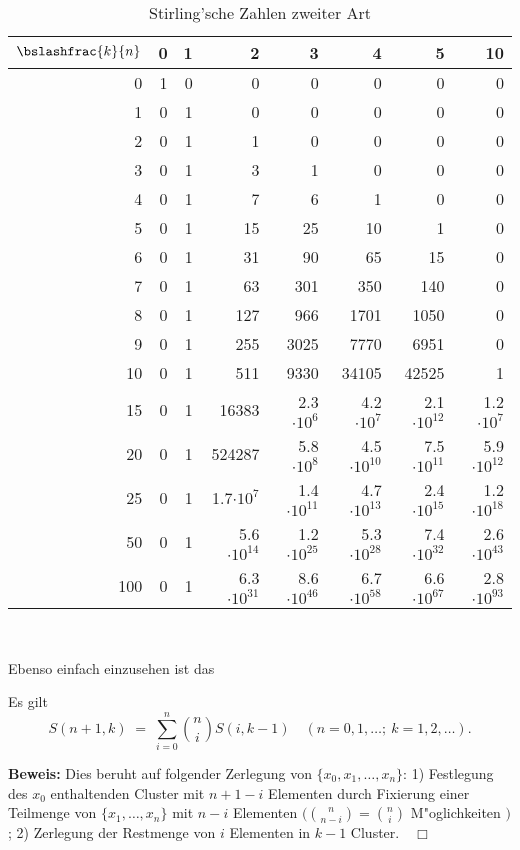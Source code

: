 \begin{table}
\caption{Stirling'sche Zahlen zweiter Art \label{tabsterling}}
\begin{center}
\begin{tabular}{|r||rrrrrrr|}\hline
	$\displaystyle \bslashfrac{k}{n}$ & 0 & 1 & 2 & 3 & 4 & 5 & 10 \\
	\hline\hline
	0    & 1 & 0 & 0 & 0 & 0 & 0 & 0  \\
	1    & 0 & 1 & 0 & 0 & 0 & 0 & 0  \\
	2    & 0 & 1 & 1 & 0 & 0 & 0 & 0  \\
	3    & 0 & 1 & 3 & 1 & 0 & 0 & 0  \\
	4    & 0 & 1 & 7 & 6 & 1 & 0 & 0  \\
	5    & 0 & 1 & 15 & 25 & 10 & 1  & 0  \\
	6    & 0 & 1 & 31 & 90 & 65 & 15 & 0  \\
	7    & 0 & 1 & 63 & 301 & 350 & 140 & 0  \\
	8    & 0 & 1 & 127 & 966 & 1701 & 1050 & 0  \\
	9    & 0 & 1 & 255 & 3025 & 7770 & 6951 & 0  \\
	10   & 0 & 1 & 511 & 9330 & 34105 & 42525 & 1  \\
	15   & 0 & 1 & 16383 & 2.3$\cdot 10^{6}$ & 4.2$\cdot 10^{7}$ & 2.1$\cdot 10^{12}$ & 1.2$\cdot 10^{7}$  \\
	20   & 0 & 1 &  524287 & 5.8$\cdot 10^{8}$ & 4.5$\cdot 10^{10}$ & 7.5$\cdot 10^{11}$ & 5.9$\cdot 10^{12}$  \\
	25   & 0 & 1 & 1.7$\cdot 10^{7}$ & 1.4$\cdot 10^{11}$ & 4.7$\cdot 10^{13}$ & 2.4$\cdot 10^{15}$ & 1.2$\cdot 10^{18}$  \\
	50   & 0 & 1 & 5.6$\cdot 10^{14}$ & 1.2$\cdot 10^{25}$ & 5.3$\cdot 10^{28}$ & 7.4$\cdot 10^{32}$ & 2.6$\cdot 10^{43}$  \\
	100  & 0 & 1 & 6.3$\cdot 10^{31}$ & 8.6$\cdot 10^{46}$ & 6.7$\cdot 10^{58}$ & 6.6$\cdot 10^{67}$ & 2.8$\cdot 10^{93}$  \\
	\hline
\end{tabular}\\
\end{center}
\end{table}

Ebenso einfach einzusehen ist das 
\begin{lemma}
Es gilt
\begin{equation}
	\label{stirlingrek}
	S(n+1,k) \; = \; \sum_{i=0}^n {n \choose i} S(i,k-1) \quad
		(n=0,1,\dots;\ k=1,2,\dots).
\end{equation}
\end{lemma}
{\bf Beweis:}
Dies beruht auf folgender Zerlegung von $\{x_0,x_1,\dots,x_n\}$: 
1) Festlegung
des $x_0$ enthaltenden Cluster mit $n+1-i$ Elementen durch Fixierung einer
Teilmenge von $\{x_1,\dots,x_n\}$ mit $n-i$ Elementen
$\Big( {n \choose n-i} = {n \choose i }$ M"oglichkeiten $\Big)$;
2) Zerlegung der Restmenge von $i$ Elementen in $k-1$ Cluster.$\quad\Box$
\vspace*{0.5cm}


